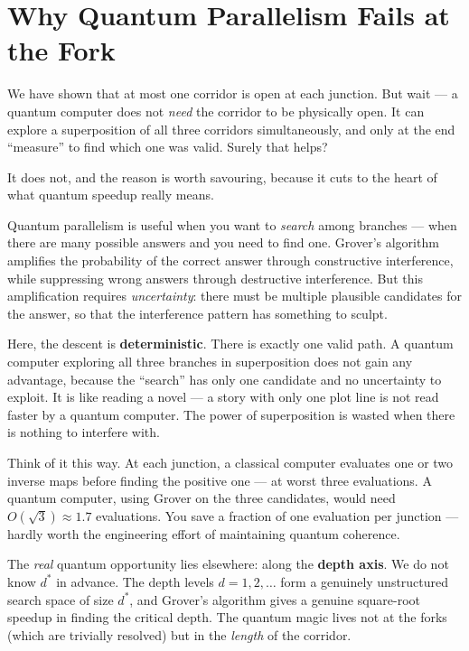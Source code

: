 \section{Why Quantum Parallelism Fails at the Fork}\label{ch7-why-quantum-parallelism-fails-at-the-fork}

We have shown that at most one corridor is open at each junction. But wait --- a quantum computer does not \emph{need} the corridor to be physically open. It can explore a superposition of all three corridors simultaneously, and only at the end ``measure'' to find which one was valid. Surely that helps?

It does not, and the reason is worth savouring, because it cuts to the heart of what quantum speedup really means.

Quantum parallelism is useful when you want to \emph{search} among branches --- when there are many possible answers and you need to find one. Grover's algorithm amplifies the probability of the correct answer through constructive interference, while suppressing wrong answers through destructive interference. But this amplification requires \emph{uncertainty}: there must be multiple plausible candidates for the answer, so that the interference pattern has something to sculpt.

Here, the descent is \textbf{deterministic}. There is exactly one valid path. A quantum computer exploring all three branches in superposition does not gain any advantage, because the ``search'' has only one candidate and no uncertainty to exploit. It is like reading a novel --- a story with only one plot line is not read faster by a quantum computer. The power of superposition is wasted when there is nothing to interfere with.

Think of it this way. At each junction, a classical computer evaluates one or two inverse maps before finding the positive one --- at worst three evaluations. A quantum computer, using Grover on the three candidates, would need \(O(\sqrt{3}) \approx 1.7\) evaluations. You save a fraction of one evaluation per junction --- hardly worth the engineering effort of maintaining quantum coherence.

The \emph{real} quantum opportunity lies elsewhere: along the \textbf{depth axis}. We do not know \(d^*\) in advance. The depth levels \(d = 1, 2, \ldots\) form a genuinely unstructured search space of size \(d^*\), and Grover's algorithm gives a genuine square-root speedup in finding the critical depth. The quantum magic lives not at the forks (which are trivially resolved) but in the \emph{length} of the corridor.


